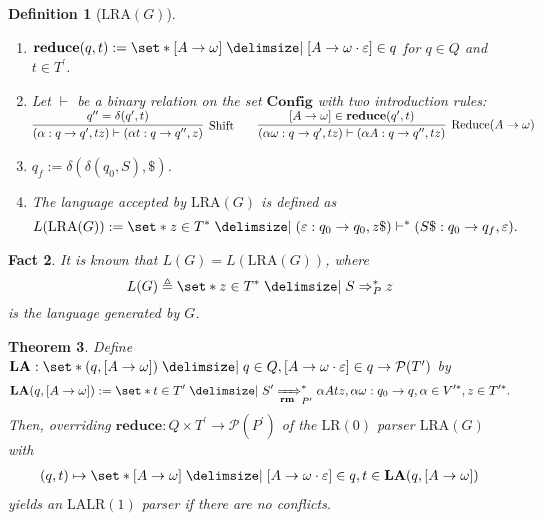 \documentclass[12pt]{article}
\newtheorem{theorem}{Theorem}
\newtheorem{definition}[theorem]{Definition}
\newtheorem{fact}[theorem]{Fact}
\newcommand{\powerset}{ \ensuremath{\mathcal{P}} }
\begin{document}
\begin{definition}[$\mathrm{LRA}(G)$]
\begin{enumerate}
\item[$\mathrm{(xii)}$] $\mathbf{reduce} ( q , t ) := \set*{ [ A \to \omega ] \mid [ A \to \omega \cdot \varepsilon ] \in q }$ for $q \in Q$ and $t \in T^\prime$.
\item[$\mathrm{(vii)}$] Let $\vdash$ be a binary relation on the set $\mathbf{Config}$ with two introduction rules: \newline $\begin{matrix} \infer[\mathrm{Shift}]{ ( \alpha : q \to q^\prime , t z ) \vdash ( \alpha t : q \to q^{\prime \prime} , z ) }{ q^{\prime \prime} = \delta ( q^\prime , t ) } & & \infer[\mathrm{Reduce} ( A \to \omega )]{ ( \alpha \omega : q \to q^\prime , t z ) \vdash ( \alpha A : q \to q^{\prime \prime} , t z ) }{ [ A \to \omega ] \in \mathbf{reduce} ( q^\prime , t ) } \end{matrix}$
\item[$\mathrm{(xiv)}$] $q_f := \delta ( \delta ( q_0 , S ) , \$ )$.
\item[$\mathrm{(xv)}$] The language accepted by $\mathrm{LRA}(G)$ is defined as \[L ( \mathrm{LRA} ( G ) ) := \set*{ z \in { T }^\ast \mid ( \varepsilon : q_0 \to q_0 , z \$ ) \vdash^\ast ( S \$ : q_0 \to q_f , \varepsilon ) } .\]
\end{enumerate}
\end{definition}

\begin{fact}
It is known that $L ( G ) = L ( \mathrm{LRA} ( G ) )$, where \[L(G) \triangleq \set*{ z \in { T }^\ast \mid S \Rightarrow_{P}^\ast z }\] is the language generated by $G$.
\end{fact}

\begin{theorem}
Define $\mathbf{LA} : \set*{ ( q , [ A \to \omega ] ) \mid q \in Q , [ A \to \omega \cdot \varepsilon ] \in q } \to \powerset ( T^\prime )$ by
\begin{align}
\mathbf{LA} ( q , [ A \to \omega ] ) := \set*{ t \in T^\prime \mid S^\prime \xRightarrow[\mathbf{rm}]{}_{P^\prime}^\ast \alpha A t z , \alpha \omega : q_0 \to q , \alpha \in V^{\prime \ast}, z \in T^{\prime \ast} } .
\end{align}
Then, overriding $\mathbf{reduce} : Q \times T^\prime \to \powerset ( P^\prime )$ of the $\mathrm{LR(0)}$ parser $\mathrm{LRA} ( G )$ with
\begin{align*}
( q , t ) \mapsto \set*{ [ A \to \omega ] \mid [ A \to \omega \cdot \varepsilon ] \in q , t \in \mathbf{LA} ( q , [ A \to \omega ] ) }
\end{align*}
yields an $\mathrm{LALR(1)}$ parser if there are no conflicts.
\end{theorem}
\end{document}
